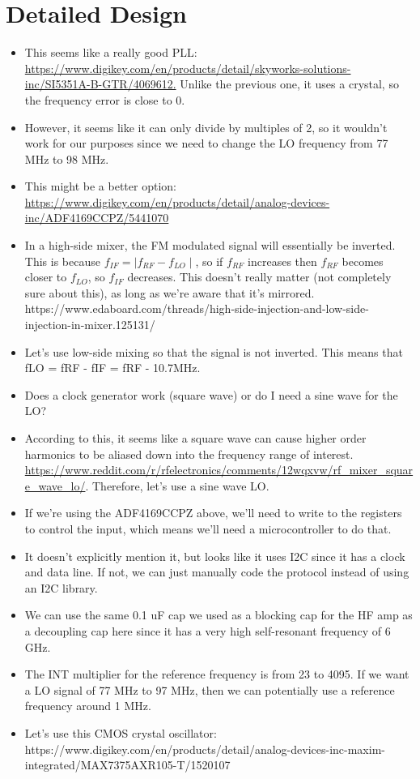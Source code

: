 \documentclass[12pt, letterpaper]{article}
\begin{document}
\section{Detailed Design}

\begin{itemize}
    \item This seems like a really good PLL: \url{https://www.digikey.com/en/products/detail/skyworks-solutions-inc/SI5351A-B-GTR/4069612.} Unlike the previous one, it uses a crystal, so the frequency error is close to 0.
    \item However, it seems like it can only divide by multiples of 2, so it wouldn't work for our purposes since we need to change the LO frequency from 77 MHz to 98 MHz. 
    \item This might be a better option: \url{https://www.digikey.com/en/products/detail/analog-devices-inc/ADF4169CCPZ/5441070}
    \item In a high-side mixer, the FM modulated signal will essentially be inverted. This is because \(f_{IF} = \mid f_{RF} - f_{LO} \mid \), so if \(f_{RF}\) increases then \(f_{RF}\) becomes closer to \(f_{LO}\), so \(f_{IF}\) decreases. This doesn't really matter (not completely sure about this), as long as we're aware that it's mirrored. https://www.edaboard.com/threads/high-side-injection-and-low-side-injection-in-mixer.125131/
    \item Let's use low-side mixing so that the signal is not inverted. This means that fLO = fRF - fIF = fRF - 10.7MHz.
    \item Does a clock generator work (square wave) or do I need a sine wave for the LO?
    \item According to this, it seems like a square wave can cause higher order harmonics to be aliased down into the frequency range of interest. \url{https://www.reddit.com/r/rfelectronics/comments/12wqxvw/rf_mixer_square_wave_lo/}. Therefore, let's use a sine wave LO.
    \item If we're using the ADF4169CCPZ above, we'll need to write to the registers to control the input, which means we'll need a microcontroller to do that.
    \item It doesn't explicitly mention it, but looks like it uses I2C since it has a clock and data line. If not, we can just manually code the protocol instead of using an I2C library.
    \item We can use the same 0.1 uF cap we used as a blocking cap for the HF amp as a decoupling cap here since it has a very high self-resonant frequency of 6 GHz.
    \item The INT multiplier for the reference frequency is from 23 to 4095. If we want a LO signal of 77 MHz to 97 MHz, then we can potentially use a reference frequency around 1 MHz.
    \item Let's use this CMOS crystal oscillator: https://www.digikey.com/en/products/detail/analog-devices-inc-maxim-integrated/MAX7375AXR105-T/1520107
\end{itemize}
\end{document}
